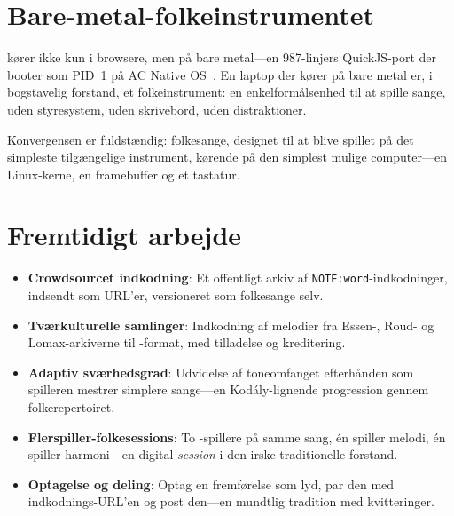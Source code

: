 \documentclass[11pt]{article}
\begin{document}
\section{Bare-metal-folkeinstrumentet}

\np{} kører ikke kun i browsere, men på bare metal---en 987-linjers QuickJS-port der booter som PID~1 på AC Native OS~\citep{scudder2026os}. En laptop der kører \np{} på bare metal er, i bogstavelig forstand, et folkeinstrument: en enkelformålsenhed til at spille sange, uden styresystem, uden skrivebord, uden distraktioner.

\begin{accentcard}
Konvergensen er fuldstændig: folkesange, designet til at blive spillet på det simpleste tilgængelige instrument, kørende på den simplest mulige computer---en Linux-kerne, en framebuffer og et tastatur.
\end{accentcard}

\section{Fremtidigt arbejde}

\begin{card}
\begin{itemize}
  \item \textbf{Crowdsourcet indkodning}: Et offentligt arkiv af \texttt{NOTE:word}-indkodninger, indsendt som URL'er, versioneret som folkesange selv.
  \item \textbf{Tværkulturelle samlinger}: Indkodning af melodier fra Essen-, Roud- og Lomax-arkiverne til \np{}-format, med tilladelse og kreditering.
  \item \textbf{Adaptiv sværhedsgrad}: Udvidelse af toneomfanget efterhånden som spilleren mestrer simplere sange---en Kod\'aly-lignende progression gennem folkerepertoiret.
  \item \textbf{Flerspiller-folkesessions}: To \np{}-spillere på samme sang, én spiller melodi, én spiller harmoni---en digital \textit{session} i den irske traditionelle forstand.
  \item \textbf{Optagelse og deling}: Optag en fremførelse som lyd, par den med indkodnings-URL'en og post den---en mundtlig tradition med kvitteringer.
\end{itemize}
\end{card}
\end{document}
